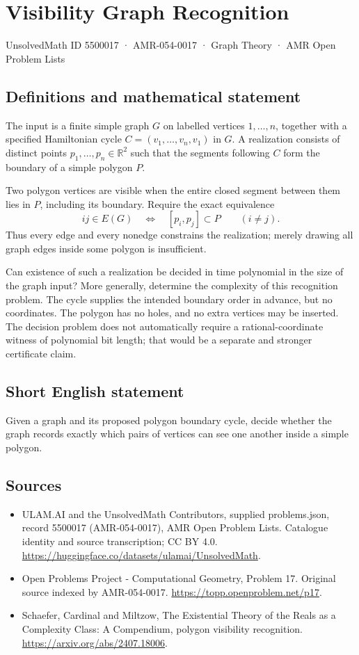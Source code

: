 \documentclass[11pt,a4paper]{article}
\begin{document}
\section*{Visibility Graph Recognition}\label{5500017}
{\small UnsolvedMath ID 5500017 · AMR-054-0017 · Graph Theory · AMR Open Problem Lists}
\subsection{Definitions and mathematical statement}
The input is a finite simple graph $G$ on labelled vertices
$1,\ldots,n$, together with a specified Hamiltonian cycle
$C=(v_1,\ldots,v_n,v_1)$ in $G$. A realization consists of distinct
points $p_1,\ldots,p_n\in\mathbb R^2$ such that the segments following
$C$ form the boundary of a simple polygon $P$.

Two polygon vertices are visible when the entire closed segment between
them lies in $P$, including its boundary. Require the exact equivalence
\[
            ij\in E(G)\quad\Longleftrightarrow\quad[p_i,p_j]\subset P
            \qquad(i\ne j).
\]
Thus every edge and every nonedge constrains the realization; merely
drawing all graph edges inside some polygon is insufficient.

Can existence of such a realization be decided in time polynomial in
the size of the graph input? More generally, determine the complexity
of this recognition problem. The cycle supplies the intended boundary
order in advance, but no coordinates. The polygon has no holes, and
no extra vertices may be inserted. The decision problem does not
automatically require a rational-coordinate witness of polynomial
bit length; that would be a separate and stronger certificate claim.
\subsection{Short English statement}
Given a graph and its proposed polygon boundary cycle, decide whether
the graph records exactly which pairs of vertices can see one another
inside a simple polygon.
\subsection{Sources}
\begin{itemize}
\item[S1] ULAM.AI and the UnsolvedMath Contributors, supplied problems.json, record 5500017 (AMR-054-0017), AMR Open Problem Lists. Catalogue identity and source transcription; CC BY 4.0.
\url{https://huggingface.co/datasets/ulamai/UnsolvedMath}.
\item[S2] Open Problems Project - Computational Geometry, Problem 17. Original source indexed by AMR-054-0017.
\url{https://topp.openproblem.net/p17}.
\item[S3] Schaefer, Cardinal and Miltzow, The Existential Theory of the Reals as a Complexity Class: A Compendium, polygon visibility recognition.
\url{https://arxiv.org/abs/2407.18006}.
\end{itemize}
\end{document}
